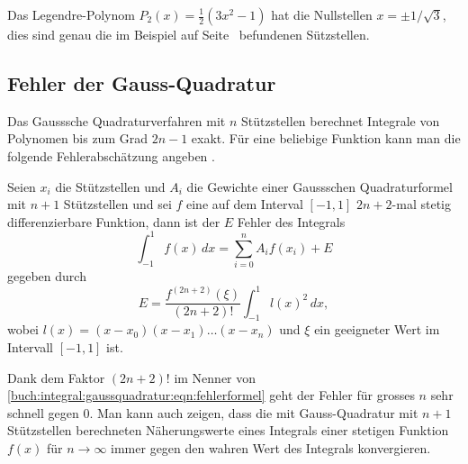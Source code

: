 \begin{beispiel}
Das Legendre-Polynom $P_2(x) = \frac12(3x^2-1)$ hat die
Nullstellen $x=\pm1/\sqrt{3}$, dies sind genau die im Beispiel
auf Seite~\pageref{buch:integral:beispiel:gaussquadraturn1} befundenen
Sützstellen.
\end{beispiel}

\subsection{Fehler der Gauss-Quadratur}
Das Gausssche Quadraturverfahren mit $n$ Stützstellen berechnet
Integrale von Polynomen bis zum Grad $2n-1$ exakt.
Für eine beliebige Funktion kann man die folgende Fehlerabschätzung
angeben \cite[theorem 7.3.4, p.~497]{buch:numal}.

\begin{satz}
Seien $x_i$ die Stützstellen und $A_i$ die Gewichte einer
Gaussschen Quadraturformel mit $n+1$ Stützstellen und sei $f$
eine auf dem Interval $[-1,1]$ $2n+2$-mal stetig differenzierbare
Funktion, dann ist der $E$ Fehler des Integrals
\[
\int_{-1}^1 f(x)\,dx = \sum_{i=0}^n A_i f(x_i) + E
\]
gegeben durch
\begin{equation}
E = \frac{f^{(2n+2)}(\xi)}{(2n+2)!}\int_{-1}^1 l(x)^2\,dx,
\label{buch:integral:gaussquadratur:eqn:fehlerformel}
\end{equation}
wobei $l(x)=(x-x_0)(x-x_1)\dots(x-x_n)$  und $\xi$ ein geeigneter
Wert im Intervall $[-1,1]$ ist.
\end{satz}

Dank dem Faktor $(2n+2)!$ im Nenner von
\eqref{buch:integral:gaussquadratur:eqn:fehlerformel}
geht der Fehler für grosses $n$ sehr schnell gegen $0$.
Man kann auch zeigen, dass die mit Gauss-Quadratur mit $n+1$
Stützstellen berechneten Näherungswerte eines Integrals einer
stetigen Funktion $f(x)$ für $n\to\infty$ immer gegen den wahren
Wert des Integrals konvergieren.

